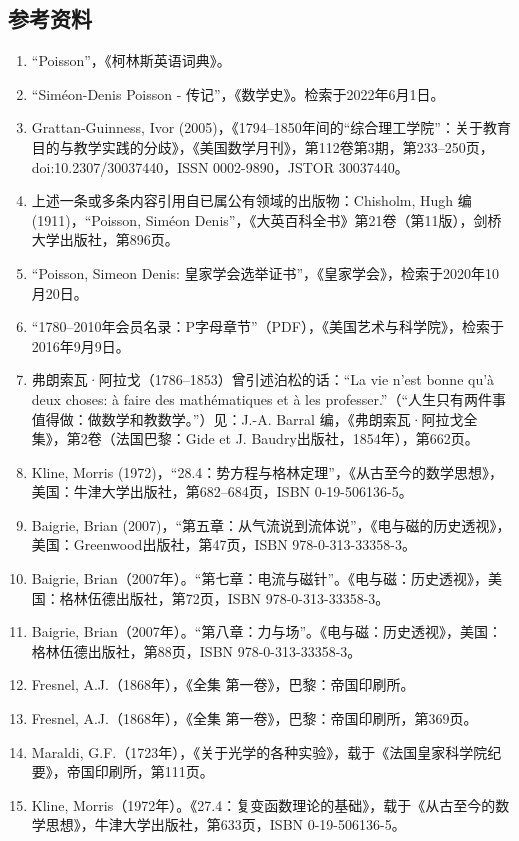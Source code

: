 \subsection{参考资料}
\begin{enumerate}
\item “Poisson”，《柯林斯英语词典》。
\item “Siméon-Denis Poisson - 传记”，《数学史》。检索于2022年6月1日。
\item Grattan-Guinness, Ivor (2005)，《1794–1850年间的“综合理工学院”：关于教育目的与教学实践的分歧》，《美国数学月刊》，第112卷第3期，第233–250页，doi:10.2307/30037440，ISSN 0002-9890，JSTOR 30037440。
\item 上述一条或多条内容引用自已属公有领域的出版物：Chisholm, Hugh 编 (1911)，“Poisson, Siméon Denis”，《大英百科全书》第21卷（第11版），剑桥大学出版社，第896页。
\item “Poisson, Simeon Denis: 皇家学会选举证书”，《皇家学会》，检索于2020年10月20日。
\item “1780–2010年会员名录：P字母章节”（PDF），《美国艺术与科学院》，检索于2016年9月9日。
\item 弗朗索瓦·阿拉戈（1786–1853）曾引述泊松的话：“La vie n'est bonne qu'à deux choses: à faire des mathématiques et à les professer.”（“人生只有两件事值得做：做数学和教数学。”）见：J.-A. Barral 编，《弗朗索瓦·阿拉戈全集》，第2卷（法国巴黎：Gide et J. Baudry出版社，1854年），第662页。
\item Kline, Morris (1972)，“28.4：势方程与格林定理”，《从古至今的数学思想》，美国：牛津大学出版社，第682–684页，ISBN 0-19-506136-5。
\item Baigrie, Brian (2007)，“第五章：从气流说到流体说”，《电与磁的历史透视》，美国：Greenwood出版社，第47页，ISBN 978-0-313-33358-3。
\item Baigrie, Brian（2007年）。“第七章：电流与磁针”。《电与磁：历史透视》，美国：格林伍德出版社，第72页，ISBN 978-0-313-33358-3。
\item Baigrie, Brian（2007年）。“第八章：力与场”。《电与磁：历史透视》，美国：格林伍德出版社，第88页，ISBN 978-0-313-33358-3。
\item Fresnel, A.J.（1868年），《全集 第一卷》，巴黎：帝国印刷所。
\item Fresnel, A.J.（1868年），《全集 第一卷》，巴黎：帝国印刷所，第369页。
\item Maraldi, G.F.（1723年），《关于光学的各种实验》，载于《法国皇家科学院纪要》，帝国印刷所，第111页。
\item Kline, Morris（1972年）。《27.4：复变函数理论的基础》，载于《从古至今的数学思想》，牛津大学出版社，第633页，ISBN 0-19-506136-5。

\end{enumerate}
